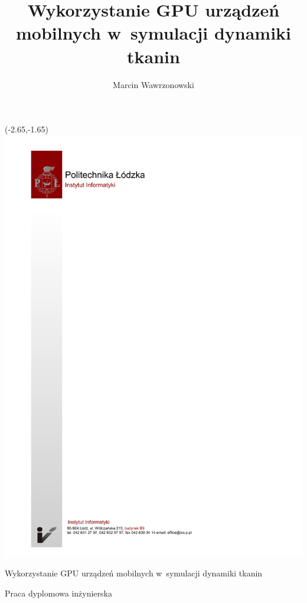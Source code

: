 \documentclass[12pt, oneside, a4paper]{mwbk}
\begin{document}
\author{Marcin Wawrzonowski}
\title{Wykorzystanie GPU urządzeń mobilnych w~symulacji dynamiki tkanin}
\begin{titlepage}
\thispagestyle{empty}
\begin{textblock}{1}(-2.65,-1.65)
\includegraphics{figures/tytulowa_pusta_mgrinz.pdf}
\end{textblock}
\vspace{7.3cm}
\begin{center}
\selectfont
\Huge
Wykorzystanie GPU urządzeń mobilnych w~symulacji dynamiki tkanin
\end{center}
\begin{center}
\selectfont
Praca dyplomowa inżynierska
\end{center}
\vspace{7.0cm}
\begin{center}

\end{center}
\end{titlepage}
\end{document}
